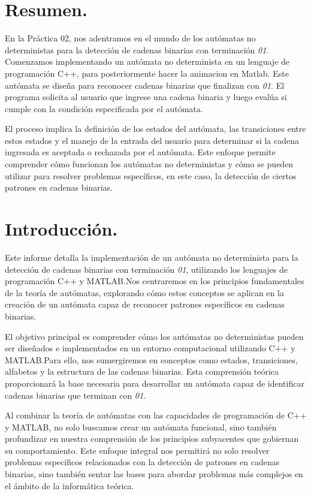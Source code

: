 \documentclass{article}
\begin{document}
\section{Resumen.}
En la Práctica 02, nos adentramos en el mundo de los autómatas no deterministas para la detección de cadenas binarias con terminación
\textit{01}. Comenzamos implementando un autómata no determinista en un lenguaje de programación C++, para posteriormente hacer la
animacion en Matlab. Este autómata se diseña para reconocer cadenas binarias que finalizan con \textit{01}. El programa solicita al
usuario que ingrese una cadena binaria y luego evalúa si cumple con la condición especificada por el autómata.

El proceso implica la definición de los estados del autómata, las transiciones entre estos estados y el manejo de la entrada del
usuario para determinar si la cadena ingresada es aceptada o rechazada por el autómata. Este enfoque permite comprender cómo funcionan
los autómatas no deterministas y cómo se pueden utilizar para resolver problemas específicos, en este caso, la detección de ciertos
patrones en cadenas binarias.

\section{Introducción.}
Este informe detalla la implementación de un autómata no determinista para la detección de cadenas binarias con terminación \textit{01},
utilizando los lenguajes de programación C++ y MATLAB.\@ Nos centraremos en los principios fundamentales de la teoría de autómatas,
explorando cómo estos conceptos se aplican en la creación de un autómata capaz de reconocer patrones específicos en cadenas binarias.

El objetivo principal es comprender cómo los autómatas no deterministas pueden ser diseñados e implementados en un entorno
computacional utilizando C++ y MATLAB.\@ Para ello, nos sumergiremos en conceptos como estados, transiciones, alfabetos y la estructura
de las cadenas binarias. Esta comprensión teórica proporcionará la base necesaria para desarrollar un autómata capaz de identificar
cadenas binarias que terminan con \textit{01}.

Al combinar la teoría de autómatas con las capacidades de programación de C++ y MATLAB, no solo buscamos crear un autómata funcional, sino también profundizar en nuestra comprensión de los principios subyacentes que gobiernan su comportamiento. Este enfoque integral nos permitirá no solo resolver problemas específicos relacionados con la detección de patrones en cadenas binarias, sino también sentar las bases para abordar problemas más complejos en el ámbito de la informática teórica.
\end{document}
